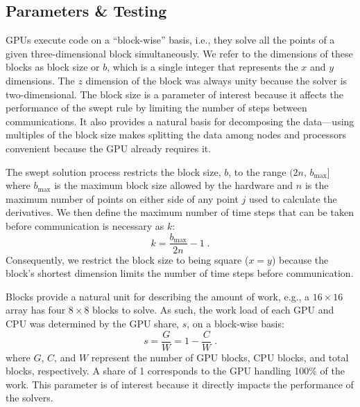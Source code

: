 \documentclass[mca,article,submit,moreauthors,pdftex]{Definitions/mdpi}
\begin{document}
\begin{paracol}{2}
\linenumbers
\switchcolumn



\subsection{Parameters \& Testing}
\label{parameters-section}

GPUs execute code on a ``block-wise'' basis, i.e., they solve all the points of a given three-dimensional block simultaneously. We refer to the dimensions of these blocks as block size or $b$, which is a single integer that represents the $x$ and $y$ dimensions. 
The $z$ dimension of the block was always unity because the solver is two-dimensional. The block size is a parameter of interest because it affects the performance of the swept rule by limiting the number of steps between communications. 
It also provides a natural basis for decomposing the data---using multiples of the block size makes splitting the data among nodes and processors convenient because the GPU already requires it.

The swept solution process restricts the block size, $b$, to the range $(2n,\,b_{\max}]$ where $b_{\max}$ is the maximum block size allowed by the hardware and $n$ is the maximum number of points on either side of any point $j$ used to calculate the derivatives. We then define the maximum number of time steps that can be taken before communication is necessary as $k$:
\begin{equation}
    \label{blocksize-equation}
    k = \frac{b_{\max}}{2n}-1 \;.
\end{equation}
Consequently, we restrict the block size to being square ($x=y$) because the block's shortest dimension limits the number of time steps before communication. 

Blocks provide a natural unit for describing the amount of work, e.g., a $16\times16$ array has four $8\times8$ blocks to solve. As such, the work load of each GPU and CPU was determined by the GPU share, $s$, on a block-wise basis:  
\begin{equation}
    \label{share-equation}
    s = \frac{G}{W} = 1-\frac{C}{W} \;.
\end{equation}
where $G$, $C$, and $W$ represent the number of GPU blocks, CPU blocks, and total blocks, respectively. 
A share of 1 corresponds to the GPU handling 100\% of the work.
This parameter is of interest because it directly impacts the performance of the solvers.


\end{paracol}
\end{document}
